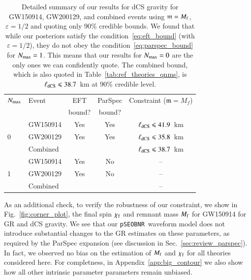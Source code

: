\documentclass[twocolumn,
               prd,
               aps,
               superscriptaddress,
               tightenlines,
               nofootinbib,
               eqsecnum,
               amsfonts,
               amsmath,
               longbibliography]{revtex4-1}
\newcommand{\Mf}{M_{\rm f}}
\newcommand{\pSEOB}{\texttt{pSEOBNR}}
\newcommand{\gm}{\mathfrak{m}}
\begin{document}
\begin{table}[h]
\begin{tabular}{l l c c c}
\hline
\hline
$N_{\rm max}$ & Event & EFT    & ParSpec & Constraint ($\gm = M_{f}$) \\
              &       & bound? & bound?  &                            \\
\hline
      & GW150914 & Yes & Yes & $\ell_{\rm dCS} \leqslant 41.9$~km \\
0     & GW200129 & Yes & Yes & $\ell_{\rm dCS} \leqslant 35.8$~km \\
      & Combined &     &     & \cellcolor{black!10}$\ell_{\rm dCS} \leqslant 38.7$~km \\
\hline
      & GW150914 & Yes & No  & --                                 \\
1     & GW200129 & Yes & No  & --                                 \\
      & Combined &     &     & --                                 \\
\hline
\hline
\end{tabular}
\caption{Detailed summary of our results for dCS gravity for GW150914, GW200129, and
combined events using $\gm = M_{\rm f}$, $\varepsilon = 1/2$ and quoting only 90\% credible bounds.
%
We found that while our posteriors satisfy the condition~\eqref{eq:eft_bound} (with $\varepsilon = 1/2$),
they do not obey the condition~\eqref{eq:parspec_bound} for $N_{\rm max} = 1$. This means
that our results for $N_{\rm max}=0$ are the only ones we can confidently quote.
%
The combined bound, which is also quoted in Table~\ref{tab:ref_theories_qnms},
is $\ell_{\rm dCS} \leqslant 38.7$~km at 90\% credible level.
}
\label{tab:summary_dcs}
\end{table}

%
As an additional check, to verify the robustness of our constraint, we show in
Fig.~\ref{fig:corner_plot}, the final spin $\chi_{\rm f}$ and remnant mass
$M_{\rm f}$ for GW150914 for GR and dCS gravity.
%
We see that our \pSEOB~waveform model does not introduce substantial changes
to the GR estimates on these parameters, as required by the ParSpec expansion
(see discussion in Sec.~\ref{sec:review_parspec}).
%
In fact, we observed no bias on the estimation of $\Mf$ and $\chi_{\rm f}$
for all theories considered here.
%
For completness, in Appendix~\ref{app:big_contour} we also
show how all other intrinsic parameter parameters remain unbiased.
\end{document}
